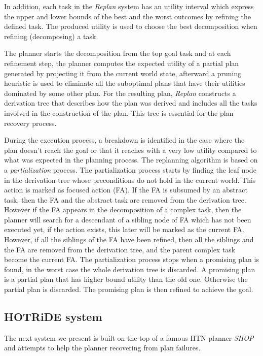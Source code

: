 In addition, each task in the \textit{Replan} system has an utility interval which express the upper and lower bounds of the best and the worst outcomes by refining the defined task. The produced utility is used to choose the best decomposition when refining (decomposing) a task.


The planner starts the decomposition from the top goal task and at each refinement step, the planner computes the expected utility of a partial plan generated by projecting it from the current world state, afterward a pruning heuristic is used to eliminate all the suboptimal plans that have their utilities dominated by some other plan. For the resulting plan, \textit{Replan} constructs a derivation tree that describes how the plan was derived and includes all the tasks involved in the construction of the plan. This tree is essential for the plan recovery process.

 
During the execution process, a breakdown is identified in the case where the plan doesn't reach the goal or that it reaches with a very low utility compared to what was expected in the planning process.
The replanning algorithm is based on a \textit{partialization} process. The partialization process starts by finding the leaf node in the derivation tree whose preconditions do not hold in the current world. This action is marked as focused action (FA). 
If the FA is subsumed by an abstract task, then the FA and the abstract task are removed from the derivation tree. However if the FA appears in the decomposition of a complex task, then the planner will search for a descendant of a sibling node of FA which has not been executed yet, if the action exists, this later will be marked as the current FA. 
However, if all the siblings of the FA have been refined, then all the siblings and the FA are removed from the derivation tree, and the parent complex task become the current FA.
The partialization process stops when a promising plan is found, in the worst case the whole derivation tree is discarded.  A promising plan is a partial plan that has higher bound utility than the old one. Otherwise the partial plan is discarded. The promising plan is then refined to achieve the goal.  

\subsection{HOTRiDE system}
The next system we present is built on the top of a famous HTN planner \textit{SHOP}\cite{nau1999shop} and attempts to help the planner  recovering from  plan failures. 


